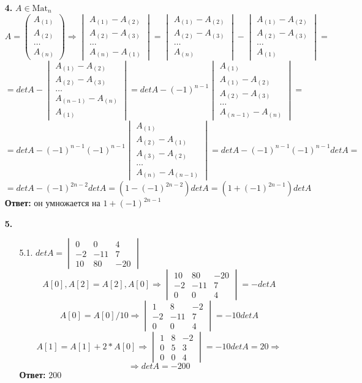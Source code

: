 \documentclass[a4paper]{article}
\newcommand{\mat}[1]{\begin{pmatrix} #1 \end{pmatrix}}
\renewcommand{\det}[1]{\begin{vmatrix} #1 \end{vmatrix}}
\renewcommand{\r}{\Rightarrow}
\begin{document}
\begin{enumerate}
    \item[\textbf{4.}]$A \in \text{Mat}_n$
    $$A = \mat{A_{(1)} \\ A_{(2)} \\ \dots \\ A_{(n)}} \r \det{A_{(1)} - A_{(2)}\\ A_{(2)}- A_{(3)} \\ \dots \\ A_{(n)} - A_{(1)}} = \det{A_{(1)} - A_{(2)}\\ A_{(2)}- A_{(3)} \\ \dots \\ A_{(n)}} -\det{A_{(1)} - A_{(2)}\\ A_{(2)}- A_{(3)} \\ \dots \\ A_{(1)}} =$$
    $$=detA - \det{A_{(1)} - A_{(2)}\\ A_{(2)}- A_{(3)} \\ \dots \\A_{(n-1)}- A_{(n)} \\ A_{(1)}} = detA - (-1)^{n-1} \det{A_{(1)} \\ A_{(1)} - A_{(2)}\\ A_{(2)}- A_{(3)} \\ \dots \\ A_{(n-1)} - A_{(n)}} = $$
    $$=detA - (-1)^{n-1} (-1)^{n-1}\det{A_{(1)} \\ A_{(2)} - A_{(1)}\\ A_{(3)}- A_{(2)} \\ \dots \\ A_{(n)} - A_{(n-1)}} = detA - (-1)^{n-1} (-1)^{n-1}detA =$$
    $$=detA - (-1)^{2n-2}detA = (1- (-1)^{2n-2})detA = (1 +(-1)^{2n-1})detA$$
    \textbf{Ответ: } он умножается на $1 +(-1)^{2n-1}$

    \item[\textbf{5.}]
    \begin{enumerate}
        \item[5.1.]$detA=\det{0 & 0 & 4 \\ -2 & -11 & 7 \\ 10 & 80 & -20}$
        $$A[0], A[2] = A[2], A[0] \r \det{10 & 80 & -20 \\ -2 & -11 & 7 \\ 0 & 0 & 4} = -detA$$
        $$A[0] = A[0]/10 \r \det{1 & 8 & -2 \\ -2 & -11 & 7 \\ 0 & 0 & 4}= -10detA$$
        $$A[1] = A[1] + 2*A[0] \r \det{1 & 8 & -2 \\ 0 & 5 & 3 \\ 0 & 0 & 4}=-10detA = 20 \r$$
        $$\r detA = -200$$
        \textbf{Ответ: }$200$\\


\end{enumerate}
\end{enumerate}
\end{document}
